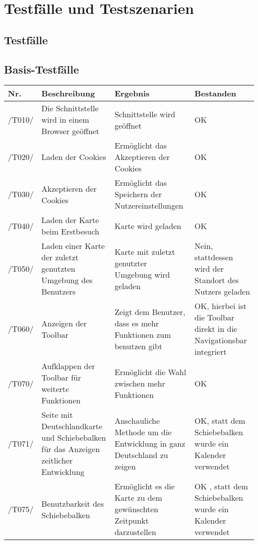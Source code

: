 \section{Testfälle und Testszenarien}
\subsection{Testfälle}


\subsection{Basis-Testfälle}

\begin{tabularx}{\linewidth}{|s| m| m| m|}
	\hline
	\textbf{Nr.} & 
	\textbf{Beschreibung} &
	\textbf{Ergebnis} &
	\textbf{Bestanden}\\
	\hline
	/T010/ & Die Schnittstelle wird in einem Browser geöffnet & Schnittstelle wird geöffnet & OK \\
	\hline
	/T020/ & Laden der \glspl{Cookie} & Ermöglicht das Akzeptieren der \glspl{Cookie} & OK \\
	\hline
	/T030/ & Akzeptieren der \glspl{Cookie} & Ermöglicht das Speichern der Nutzereinstellungen & OK \\
	\hline
	/T040/ & Laden der Karte beim Erstbesuch & Karte wird geladen & OK \\
	\hline
	/T050/ & Laden einer Karte der zuletzt genutzten Umgebung des Benutzers & Karte mit zuletzt genutzter Umgebung wird geladen & Nein, stattdessen wird der Standort des Nutzers geladen \\
	\hline
	/T060/ & Anzeigen der \gls{Toolbar} & Zeigt dem Benutzer, dass es mehr Funktionen zum benutzen gibt & OK, hierbei ist die Toolbar direkt in die Navigationsbar integriert\\
	\hline
	/T070/ & Aufklappen der \gls{Toolbar} für weiterte Funktionen & Ermöglicht die Wahl zwischen mehr Funktionen & OK \\
	\hline
	/T071/ & Seite mit Deutschlandkarte und Schiebebalken für das Anzeigen zeitlicher Entwicklung & Anschauliche Methode um die Entwicklung in ganz Deutschland zu zeigen & OK, statt dem Schiebebalken wurde ein Kalender verwendet \\
	\hline
	/T075/ & Benutzbarkeit des Schiebebalken & Ermöglicht es die Karte zu dem gewünschten Zeitpunkt darzustellen & OK , statt dem Schiebebalken wurde ein Kalender verwendet \\

\end{tabularx}
